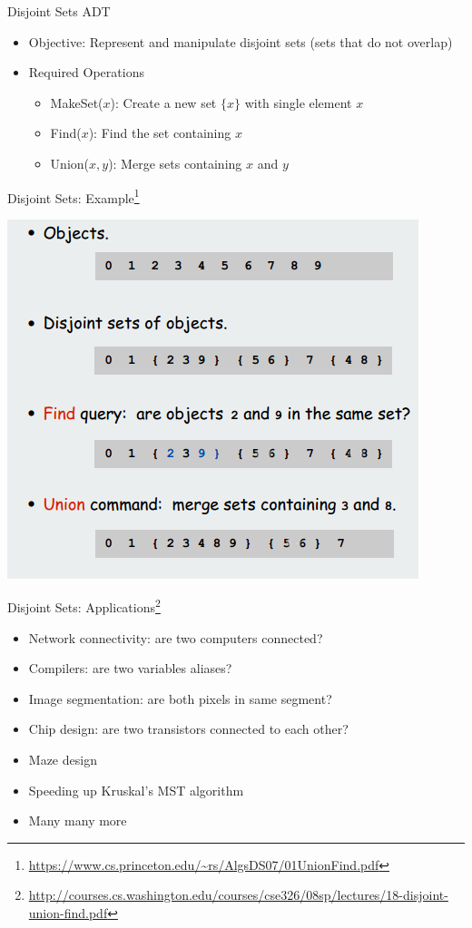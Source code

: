 \documentclass{beamer}
\begin{document}
\begin{frame}{Disjoint Sets ADT}
    \begin{itemize}
        \item Objective: Represent and manipulate disjoint sets (sets that do not overlap)
        \item Required Operations
        \begin{itemize}
            \item MakeSet($x$): Create a new set $\{x\}$ with single element $x$
            \item Find($x$): Find the set containing $x$
            \item Union($x,y$): Merge sets containing $x$ and $y$
        \end{itemize}
    \end{itemize}
\end{frame}

\begin{frame}{Disjoint Sets: Example\footnote{\url{https://www.cs.princeton.edu/~rs/AlgsDS07/01UnionFind.pdf}}}
    \begin{center}
        \includegraphics[scale=0.5]{disjointSetEg.png}
    \end{center}
\end{frame}

\begin{frame}{Disjoint Sets: Applications\footnote{\url{http://courses.cs.washington.edu/courses/cse326/08sp/lectures/18-disjoint-union-find.pdf}}}
    \begin{itemize}
        \item Network connectivity: are two computers connected? 
        \item Compilers: are two variables aliases?
        \item Image segmentation: are both pixels in same segment?
        \item Chip design: are two transistors connected to each other?
        \item Maze design
        \item Speeding up Kruskal's MST algorithm
        \item Many many more
    \end{itemize}
\end{frame}
\end{document}

